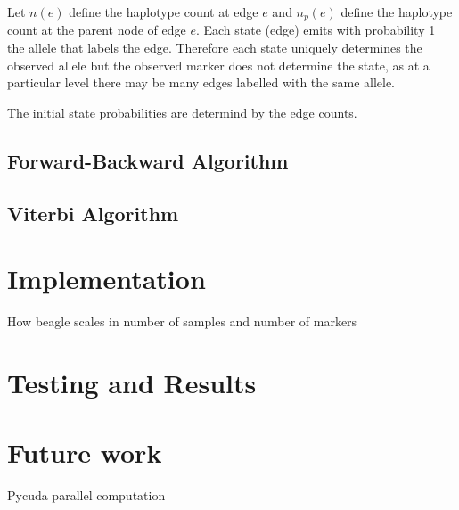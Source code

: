 \documentclass[a4paper,10pt,twoside,abstraction,titlepage]{article}
\begin{document}
Let $n(e)$ define the haplotype count at edge $e$ and $n_p(e)$ define the haplotype count at the parent node of edge $e$.  Each state (edge) emits with probability 1 the allele that labels the edge.  Therefore each state uniquely determines the observed allele but the observed marker does not determine the state, as at a particular level there may be many edges labelled with the same allele.

The initial state probabilities are determind by the edge counts.




\subsection{Forward-Backward Algorithm}

\newpage
\subsection{Viterbi Algorithm}


\newpage
\section{Implementation}
How beagle scales in number of samples and number of markers

\newpage
\section{Testing and Results}


\newpage
\section{Future work}
Pycuda parallel computation

\newpage
\end{document}
